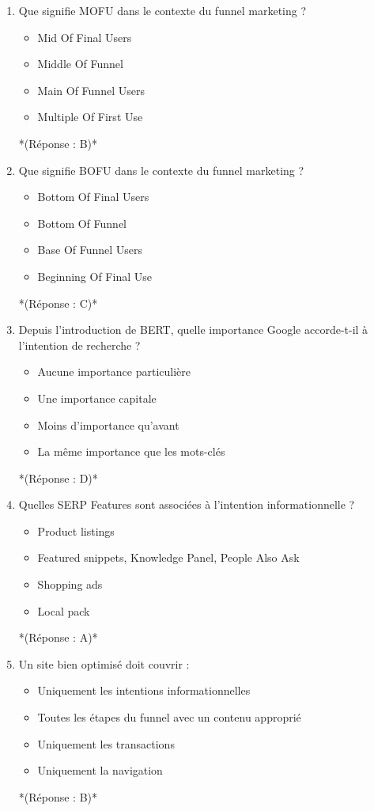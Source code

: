 \documentclass[12pt,a4paper,twoside]{report}
\begin{document}
\begin{enumerate}
\item Que signifie MOFU dans le contexte du funnel marketing ?
\begin{itemize}
\item[A)] Mid Of Final Users
\item[B)] Middle Of Funnel
\item[C)] Main Of Funnel Users
\item[D)] Multiple Of First Use
\end{itemize}
*(Réponse : B)*

\item Que signifie BOFU dans le contexte du funnel marketing ?
\begin{itemize}
\item[A)] Bottom Of Final Users
\item[B)] Bottom Of Funnel
\item[C)] Base Of Funnel Users
\item[D)] Beginning Of Final Use
\end{itemize}
*(Réponse : C)*

\item Depuis l'introduction de BERT, quelle importance Google accorde-t-il à l'intention de recherche ?
\begin{itemize}
\item[A)] Aucune importance particulière
\item[B)] Une importance capitale
\item[C)] Moins d'importance qu'avant
\item[D)] La même importance que les mots-clés
\end{itemize}
*(Réponse : D)*

\item Quelles SERP Features sont associées à l'intention informationnelle ?
\begin{itemize}
\item[A)] Product listings
\item[B)] Featured snippets, Knowledge Panel, People Also Ask
\item[C)] Shopping ads
\item[D)] Local pack
\end{itemize}
*(Réponse : A)*

\item Un site bien optimisé doit couvrir :
\begin{itemize}
\item[A)] Uniquement les intentions informationnelles
\item[B)] Toutes les étapes du funnel avec un contenu approprié
\item[C)] Uniquement les transactions
\item[D)] Uniquement la navigation
\end{itemize}
*(Réponse : B)*


\end{enumerate}
\end{document}
